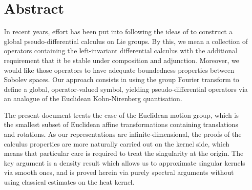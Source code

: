 \chapter*{Abstract}

In recent years,
effort has been put into following the ideas of \citeauthor{RuzhanskyTurunen10}
to construct a global pseudo-differential calculus on Lie groups.
By this, we mean a collection of operators containing the left-invariant differential calculus
with the additional requirement that it be stable under composition and adjunction.
Moreover,
we would like those operators to
have adequate boundedness properties between Sobolev spaces.
Our approach consists in using the group Fourier transform to define a global, operator-valued symbol,
yielding pseudo-differential operators via an analogue of the Euclidean Kohn-Nirenberg quantisation.

The present document treats the case of the Euclidean motion group,
which is the smallest subset of Euclidean affine transformations containing translations and rotations.
As our representations are infinite-dimensional,
the proofs of the calculus properties are more naturally carried out on the kernel side,
which means that particular care is required to treat the singularity at the origin.
The key argument is a density result which allows us to approximate singular kernels via smooth ones,
and is proved herein via purely spectral arguments without using classical estimates on the heat kernel.
